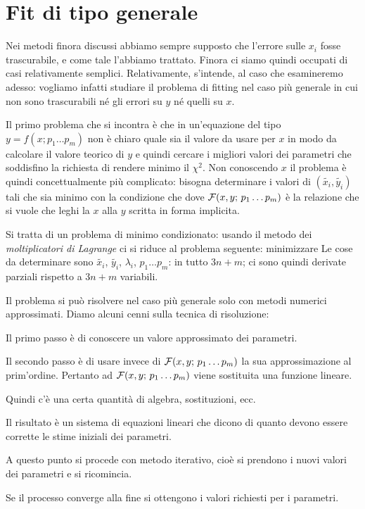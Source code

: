 \section{Fit di tipo generale}
Nei metodi finora discussi abbiamo sempre supposto che l'errore sulle $x_i$
fosse trascurabile, e come tale l'abbiamo trattato. Finora ci siamo quindi
occupati di casi relativamente semplici. Relativamente, s'intende, al caso
che esamineremo adesso: vogliamo infatti studiare il problema di fitting nel
caso pi\`u generale in cui non sono trascurabili n\'e gli errori su $y$ n\'e
quelli su $x$.

Il primo problema che si incontra \`e che in un'equazione del tipo
$y = f(x; p_1 \ldots p_m)$ non \`e chiaro quale sia il valore da usare per
$x$ in modo da calcolare il valore teorico di $y$ e quindi cercare i migliori
valori dei parametri che soddisfino la richiesta di rendere minimo il $\chi^2$.
Non conoscendo $x$ il problema \`e quindi concettualmente pi\`u
complicato: bisogna determinare i valori di $(\tilde{x_i}, \tilde{y_i})$
tali che sia minimo
con la condizione che
dove ${\cal F}(x, y; \, p_1 \ldots p_m)$  \`e la relazione che si
vuole che leghi la $x$ alla $y$ scritta in forma implicita.

Si tratta di un problema di minimo condizionato: usando il metodo dei
{\itshape moltiplicatori di Lagrange} ci si riduce al problema seguente:
minimizzare
Le cose da determinare sono $\tilde{x_i}$, $\tilde{y_i}$, $\lambda_i$,
$p_1 \ldots p_m$: in tutto $3n+m$;
ci sono quindi derivate parziali rispetto a $3n+m$ variabili.

Il problema si pu\`o risolvere nel caso pi\`u generale solo con metodi
numerici approssimati.
Diamo alcuni cenni sulla tecnica di risoluzione:
\begin{numlist}
\item{
Il primo passo \`e di conoscere un valore approssimato dei parametri.
}
\item{
Il secondo passo \`e di usare invece di  ${\cal F}(x, y; \, p_1 \ldots p_m)$
la sua approssimazione al prim'ordine. Pertanto ad 
${\cal F}(x, y; \, p_1 \ldots p_m)$ viene sostituita una funzione lineare.
}
\item{
Quindi c'\`e una certa quantit\`a di algebra, sostituzioni, ecc.
}
\item{
Il risultato \`e un sistema di equazioni lineari che dicono di quanto
devono essere corrette le stime iniziali dei parametri.
}
\item{
A questo punto si procede con metodo iterativo, cio\`e si prendono i
nuovi valori dei parametri e si ricomincia.
}
\item{
Se il processo converge alla fine si ottengono i valori richiesti
per i parametri.
}
\end{numlist}

